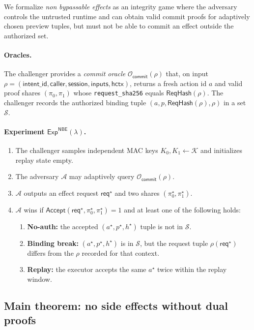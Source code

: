 We formalize \emph{non bypassable effects} as an integrity game where the adversary controls the
untrusted runtime and can obtain valid commit proofs for adaptively chosen preview tuples, but must
not be able to commit an effect outside the authorized set.

\paragraph{Oracles.}
The challenger provides a \emph{commit oracle} $\mathcal{O}_{\mathsf{commit}}(\rho)$ that, on input
$\rho = (\mathsf{intent\_id},\mathsf{caller},\mathsf{session},\mathsf{inputs},\mathsf{hctx})$, returns a fresh
action id $a$ and valid proof shares $(\pi_0,\pi_1)$ whose \texttt{request\_sha256} equals
$\mathsf{ReqHash}(\rho)$. The challenger records the authorized binding tuple
$(a,p,\mathsf{ReqHash}(\rho),\rho)$ in a set $\mathcal{S}$.

\paragraph{Experiment $\mathsf{Exp}^{\mathsf{NBE}}(\lambda)$.}
\begin{enumerate}
\item The challenger samples independent MAC keys $K_0,K_1 \leftarrow \mathcal{K}$ and initializes
replay state empty.
\item The adversary $\mathcal{A}$ may adaptively query $\mathcal{O}_{\mathsf{commit}}(\rho)$.
\item $\mathcal{A}$ outputs an effect request $\mathsf{req}^\star$ and two shares
$(\pi_0^\star,\pi_1^\star)$.
\item $\mathcal{A}$ wins if $\mathsf{Accept}(\mathsf{req}^\star,\pi_0^\star,\pi_1^\star)=1$ and at
least one of the following holds:
\begin{enumerate}
\item \textbf{No-auth:} the accepted $(a^\star,p^\star,h^\star)$ tuple is not in $\mathcal{S}$.
\item \textbf{Binding break:} $(a^\star,p^\star,h^\star)$ is in $\mathcal{S}$, but the request
tuple $\rho(\mathsf{req}^\star)$ differs from the $\rho$ recorded for that context.
\item \textbf{Replay:} the executor accepts the same $a^\star$ twice within the replay window.
\end{enumerate}
\end{enumerate}

\subsection{Main theorem: no side effects without dual proofs}
\label{app:proofs:nbe-thm}


